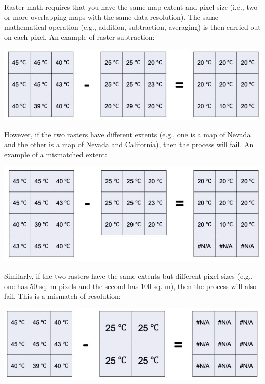 \documentclass[oneside,a4paper,11pt,explicit]{book}
\begin{document}
\begin{tcolorbox}[enhanced jigsaw,breakable,pad at break*=1mm,
  colback=yellow!5!white,colframe=IceCreamLeaf,title=An Introduction to Raster Math]

    Raster math requires that you have the same map extent and pixel size (i.e., two or more overlapping maps with the same data resolution). The same mathematical operation (e.g., addition, subtraction, averaging) is then carried out on each pixel. An example of raster subtraction:
 
    \vspace{.5em}

    \centerline{\includegraphics[width=\textwidth]{RasterMathExample.png}}

However, if the two rasters have different extents (e.g., one is a map of Nevada and the other is a map of Nevada and California), then the process will fail. An example of a mismatched extent:
   
    \vspace{.5em}

    \centerline{\includegraphics[width=\textwidth]{RasterMath-MismatchedExtent.png}}
     
    Similarly, if the two rasters have the same extents but different pixel sizes (e.g., one has 50 sq. m pixels and the second has 100 sq. m), then the process will also fail. This is a mismatch of resolution:
   
    \vspace{.5em}

    \centerline{\includegraphics[width=\textwidth]{resolution.png}}
 

\end{tcolorbox}
\end{document}
